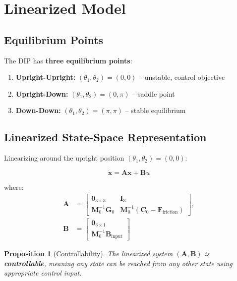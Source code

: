 \documentclass[11pt,a4paper]{article}
\newtheorem{proposition}{Proposition}[section]
\begin{document}
\section{Linearized Model}

\subsection{Equilibrium Points}

The DIP has \textbf{three equilibrium points}:

\begin{enumerate}
    \item \textbf{Upright-Upright:} $(\theta_1, \theta_2) = (0, 0)$ -- unstable, control objective
    \item \textbf{Upright-Down:} $(\theta_1, \theta_2) = (0, \pi)$ -- saddle point
    \item \textbf{Down-Down:} $(\theta_1, \theta_2) = (\pi, \pi)$ -- stable equilibrium
\end{enumerate}

\subsection{Linearized State-Space Representation}

Linearizing around the upright position $(\theta_1, \theta_2) = (0, 0)$:

\begin{equation}
    \dot{\mathbf{x}} = \mathbf{A}\mathbf{x} + \mathbf{B}u
\end{equation}

where:
\begin{align}
    \mathbf{A} &= \begin{bmatrix}
        \mathbf{0}_{3\times3} & \mathbf{I}_3 \\
        \mathbf{M}_0^{-1}\mathbf{G}_0 & \mathbf{M}_0^{-1}(\mathbf{C}_0 - \mathbf{F}_{\text{friction}})
    \end{bmatrix}, \\
    \mathbf{B} &= \begin{bmatrix} \mathbf{0}_{3\times1} \\ \mathbf{M}_0^{-1}\mathbf{B}_{\text{input}} \end{bmatrix}
\end{align}

\begin{proposition}[Controllability]
The linearized system $(\mathbf{A}, \mathbf{B})$ is \textbf{controllable}, meaning any state can be reached from any other state using appropriate control input.
\end{proposition}
\end{document}
